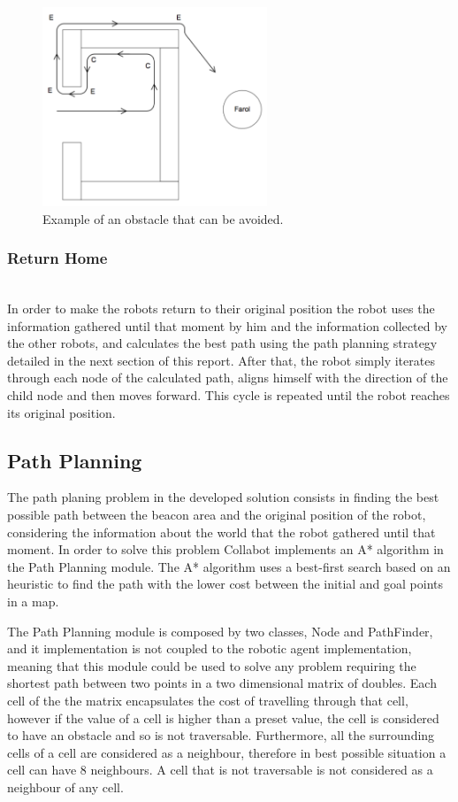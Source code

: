 \documentclass[oribibl]{llncs}
\begin{document}
\begin{figure}
  \centering
  \includegraphics[width=0.6\textwidth]{obstaculo1.png}
  \caption{Example of an obstacle that can be avoided.}
  \label{fig:obstacle1}
\end{figure}

\subsubsection{Return Home}\hfill \\

In order to make the robots return to their original position the robot uses the information gathered until that moment by him and the information collected by the other robots, and calculates the best path using the path planning strategy detailed in the next section of this report. After that, the robot simply iterates through each node of the calculated path, aligns himself with the direction of the child node and then moves forward. This cycle is repeated until the robot reaches its original position.

\subsection{Path Planning}
\label{sec:path-planning}
The path planing problem in the developed solution consists in finding the best possible path between the beacon area and the original position of the robot, considering the information about the world that the robot gathered until that moment. In order to solve this problem Collabot implements an A* algorithm in the Path Planning module. The A* algorithm uses a best-first search based on an heuristic to find the path with the lower cost between the initial and goal points in a map.

The Path Planning module is composed by two classes, Node and PathFinder, and it implementation is not coupled to the robotic agent implementation, meaning that this module could be used to solve any problem requiring the shortest path between two points in a two dimensional matrix of doubles. Each cell of the the matrix encapsulates the cost of travelling through that cell, however if the value of a cell is higher than a preset value, the cell is considered to have an obstacle and so is not traversable. Furthermore, all the surrounding cells of a cell are considered as a neighbour, therefore in best possible situation a cell can have 8 neighbours. A cell that is not traversable is not considered as a neighbour of any cell.
\end{document}
